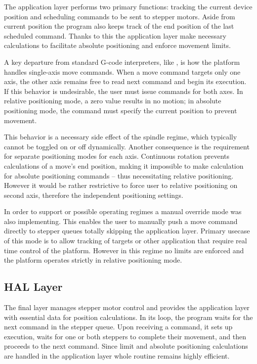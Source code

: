The application layer performs two primary functions: tracking the current device position and scheduling commands to be sent to stepper motors.
Aside from current position the program also keeps track of the end position of the last scheduled command.
Thanks to this the application layer make necessary calculations to facilitate absolute positioning and enforce movement limits.

A key departure from standard G-code interpreters, like \cite{duet}, is how the platform handles single-axis move commands.
When a move command targets only one axis, the other axis remains free to read next command and begin its execution.
If this behavior is undesirable, the user must issue commands for both axes.
In relative positioning mode, a zero value results in no motion; in absolute positioning mode, the command must specify the current position to prevent movement.

This behavior is a necessary side effect of the spindle regime, which typically cannot be toggled on or off dynamically.
Another consequence is the requirement for separate positioning modes for each axis.
Continuous rotation prevents calculations of a move’s end position, making it impossible to make calculation for absolute positioning commands -- thus necessitating relative positioning.
However it would be rather restrictive to force user to relative positioning on second axis, therefore the independent positioning settings.

In order to support or possible operating regimes a manual override mode was also implementing.
This enables the user to manually push a move command directly to stepper queues totally skipping the application layer.
Primary usecase of this mode is to allow tracking of targets or other application that require real time control of the platform.
However in this regime no limits are enforced and the platform operates strictly in relative positioning mode.


\subsection{HAL Layer}

The final layer manages stepper motor control and provides the application layer with essential data for position calculations.
In its loop, the program waits for the next command in the stepper queue.
Upon receiving a command, it sets up execution, waits for one or both steppers to complete their movement, and then proceeds to the next command.
Since limit and absolute positioning calculations are handled in the application layer whole routine remains highly efficient.

